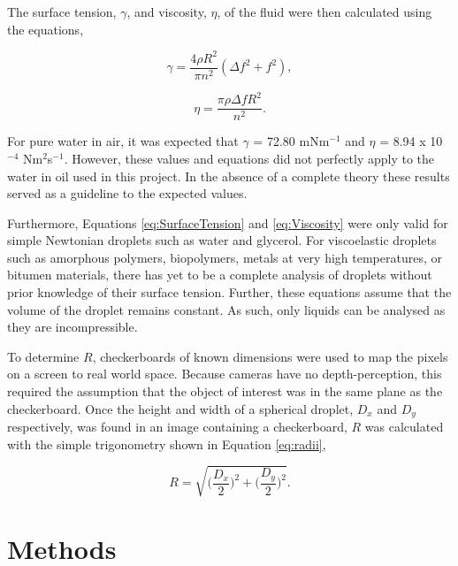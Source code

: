 \documentclass{physics_article_B}
\begin{document}
    The surface tension, $\gamma$, and viscosity, $\eta$, of the fluid were then calculated using the equations,
 
        \begin{equation} 
        \label{eq:SurfaceTension}
            \gamma = \frac{4\rho R^{2}}{\pi n^{2}}(\Delta f^{2} + f^{2}),
        \end{equation}
        
        \begin{equation} 
        \label{eq:Viscosity}
            \eta = \frac{\pi \rho \Delta f R^{2}}{n^{2}}.
        \end{equation}

    For pure water in air, it was expected that\cite{expected1} $\gamma$ = 72.80 mNm$^{-1}$ and\cite{expected2} $\eta$ = 8.94 x 10$^{-4}$ Nm$^{2}$s$^{-1}$. However, these values and equations did not perfectly apply to the water in oil used in this project. In the absence of a complete theory these results served as a guideline to the expected values. 
    
    Furthermore, Equations \ref{eq:SurfaceTension} and \ref{eq:Viscosity} were only valid for simple Newtonian droplets such as water and glycerol. For viscoelastic droplets such as amorphous polymers, biopolymers, metals at very high temperatures, or bitumen materials, there has yet to be a complete analysis of droplets without prior knowledge of their surface tension. Further, these equations assume that the volume of the droplet remains constant. As such, only liquids can be analysed as they are incompressible.
    
    To determine $R$, checkerboards of known dimensions were used to map the pixels on a screen to real world space. Because cameras have no depth-perception, this required the assumption that the object of interest was in the same plane as the checkerboard\cite{CameraCalibration}. Once the height and width of a spherical droplet, $D_x$ and $D_y$ respectively, was found in an image containing a checkerboard, $R$ was calculated with the simple trigonometry shown in Equation \ref{eq:radii},
            
        \begin{equation}\label{eq:radii}
            R = \sqrt{\Big(\frac{D_x}{2}\Big)^2 + \Big(\frac{D_y}{2}\Big)^2}.
        \end{equation}

\section{Methods\label{sect:method}}
\end{document}

